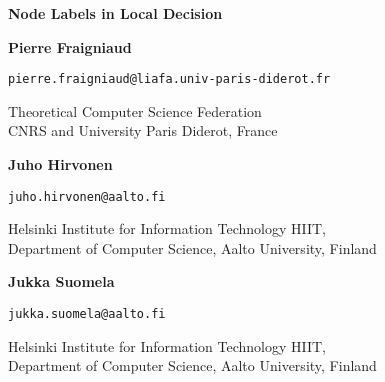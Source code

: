 \documentclass[11pt,a4paper]{article}
\theoremstyle{definition}
\theoremstyle{remark}
\newenvironment{mycover}
               {\list{}{\listparindent 0pt
                        \itemindent    \listparindent
                        \leftmargin    0pt
                        \rightmargin   0pt
                        \parsep        0pt}\raggedright
                \item\relax}
               {\endlist}
\begin{document}
\vspace*{2ex}
\begin{mycover}
{\huge \bfseries Node Labels in Local Decision\par}
\bigskip
\bigskip

\textbf{Pierre Fraigniaud}

\nolinkurl{pierre.fraigniaud@liafa.univ-paris-diderot.fr}
\medskip

{\small Theoretical Computer Science Federation \\ CNRS and University Paris Diderot, France\par}

\bigskip

\textbf{Juho Hirvonen}

\nolinkurl{juho.hirvonen@aalto.fi}
\medskip

{\small Helsinki Institute for Information Technology HIIT, \\ Department of Computer Science, Aalto University, Finland\par}
\bigskip

\textbf{Jukka Suomela}

\nolinkurl{jukka.suomela@aalto.fi}
\medskip

{\small Helsinki Institute for Information Technology HIIT, \\ Department of Computer Science, Aalto University, Finland\par}


\end{mycover}
\end{document}
